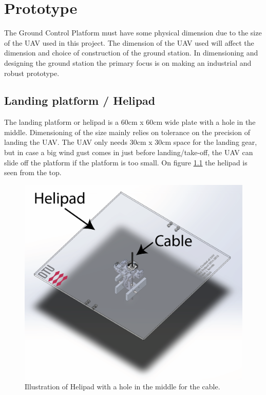 
\chapter{Prototype}
The Ground Control Platform must have some physical dimension due to the size of the UAV used in this project. The dimension of the UAV used will affect the dimension and choice of construction of the ground station. In dimensioning and designing the ground station the primary focus is on making an industrial and robust prototype. 



\section{Landing platform / Helipad}
The landing platform or helipad is a 60cm x 60cm wide plate with a hole in the middle. Dimensioning of the size mainly relies on tolerance on the precision of landing the UAV. The UAV only needs 30cm x 30cm space for the landing gear, but in case a big wind gust comes in just before landing/take-off, the UAV can slide off the platform if the platform is too small. On figure \ref{fig:helipad} the helipad is seen from the top.

\begin{figure}[hbtp]
\centering
\includegraphics[scale=0.6]{graphics/cad/toplevel.png}
\caption{Illustration of Helipad with a hole in the middle for the cable.}
\label{fig:helipad}
\end{figure}

